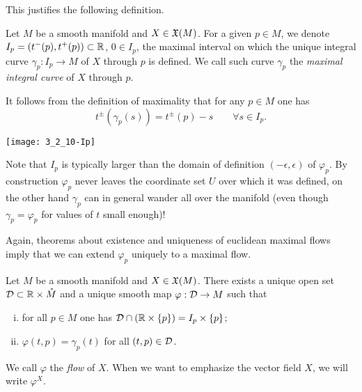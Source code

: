 This justifies the following definition.
\begin{definition}
  Let $M$ be a smooth manifold and $X\in\mathfrak{X}(M)$.
  For a given $p\in M$, we denote $I_p = \left(t^-(p), t^+(p)\right) \subset\mathbb{R}$, $0 \in I_p$, the maximal interval on which the unique integral curve $\gamma_p : I_p \to M$ of $X$ through $p$ is defined.
  We call such curve $\gamma_p$ the \emph{maximal integral curve} of $X$ through $p$.
\end{definition}

\begin{remark}
  It follows from the definition of maximality that for any $p\in M$ one has
  \begin{equation}
    t^{\pm}(\gamma_p(s)) = t^\pm(p) - s \qquad \forall s\in I_p.
  \end{equation}
\end{remark}

\begin{marginfigure}
  \texttt{[image: 3\_2\_10-Ip]}
\end{marginfigure}
Note that $I_p$ is typically larger than the domain of definition $(-\epsilon, \epsilon)$ of $\varphi_p$.
By construction $\varphi_p$ never leaves the coordinate set $U$ over which it was defined, on the other hand $\gamma_p$ can in general wander all over the manifold (even though $\gamma_p = \varphi_p$ for values of $t$ small enough)!

Again, theorems about existence and uniqueness of euclidean maximal flows imply that we can extend $\varphi_p$ uniquely to a maximal flow.

\begin{theorem} %
  \label{thm:exuniqmax}
  Let $M$ be a smooth manifold and $X\in\mathfrak{X}(M)$.
  There exists a unique open set $\mathcal{D} \subset \mathbb{R}\times\mathring M$ and a unique smooth map $\varphi:\mathcal{D}\to M$ such that
  \begin{enumerate}[(i)]
    \item\label{thm:exuniqmax:i} for all $p\in M$ one has $\mathcal{D}\cap(\mathbb{R}\times\{p\}) = I_p\times\{p\}$;
    \item\label{thm:exuniqmax:ii} $\varphi(t,p) = \gamma_p(t)$ for all $(t,p)\in\mathcal{D}$.
  \end{enumerate}
\end{theorem}

We call $\varphi$ the \emph{flow} of $X$.
When we want to emphasize the vector field $X$, we will write $\varphi^X$.

